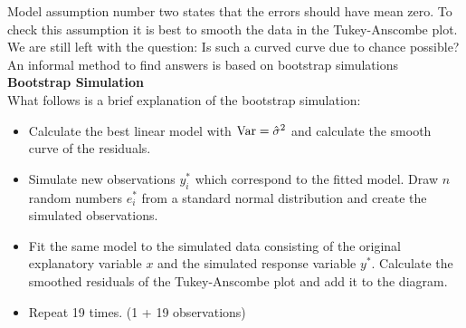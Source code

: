 Model assumption number two states that the errors should have mean zero. To check this assumption it is best to smooth the data in the
Tukey-Anscombe plot. We are still left with the question: Is such a curved curve due to chance possible? An informal method to find answers is based on bootstrap simulations\\

\textbf{Bootstrap Simulation}\\
What follows is a brief explanation of the bootstrap simulation:\\
\begin{itemize}
  \item Calculate the best linear model with $\textup{Var} = \hat{\sigma}^2$ and calculate the smooth curve of the residuals.
  \item Simulate new observations $y^*_i$ which correspond to the fitted model. Draw $n$ random numbers $e^*_i$ from a standard normal distribution and create the simulated observations.
  \item Fit the same model to the simulated data consisting of the original explanatory variable $x$ and the simulated response variable $y^*$.
  Calculate the smoothed residuals of the Tukey-Anscombe plot and add it to the diagram.
  \item Repeat 19 times. (1 + 19 observations)
\end{itemize}

